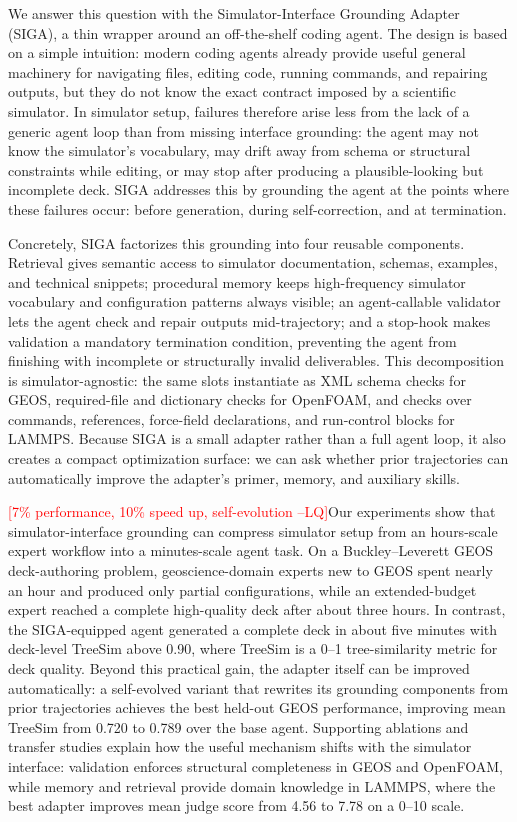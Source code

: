 \documentclass{article}
\newcommand{\lianhui}[1]{\textcolor{red}{[#1 --LQ]}}
\begin{document}
We answer this question with the Simulator-Interface Grounding Adapter (SIGA), a thin wrapper around an off-the-shelf coding agent. The design is based on a simple intuition: modern coding agents already provide useful general machinery for navigating files, editing code, running commands, and repairing outputs, but they do not know the exact contract imposed by a scientific simulator. In simulator setup, failures therefore arise less from the lack of a generic agent loop than from missing interface grounding: the agent may not know the simulator’s vocabulary, may drift away from schema or structural constraints while editing, or may stop after producing a plausible-looking but incomplete deck. SIGA addresses this by grounding the agent at the points where these failures occur: before generation, during self-correction, and at termination.

Concretely, SIGA factorizes this grounding into four reusable components. Retrieval gives semantic access to simulator documentation, schemas, examples, and technical snippets; procedural memory keeps high-frequency simulator vocabulary and configuration patterns always visible; an agent-callable validator lets the agent check and repair outputs mid-trajectory; and a stop-hook makes validation a mandatory termination condition, preventing the agent from finishing with incomplete or structurally invalid deliverables. This decomposition is simulator-agnostic: the same slots instantiate as XML schema checks for GEOS, required-file and dictionary checks for OpenFOAM, and checks over commands, references, force-field declarations, and run-control blocks for LAMMPS. Because SIGA is a small adapter rather than a full agent loop, it also creates a compact optimization surface: we can ask whether prior trajectories can automatically improve the adapter’s primer, memory, and auxiliary skills.

\lianhui{7\% performance, 10\% speed up, self-evolution }Our experiments show that simulator-interface grounding can compress simulator setup from an hours-scale expert workflow into a minutes-scale agent task. On a Buckley–Leverett GEOS deck-authoring problem, geoscience-domain experts new to GEOS spent nearly an hour and produced only partial configurations, while an extended-budget expert reached a complete high-quality deck after about three hours. In contrast, the SIGA-equipped agent generated a complete deck in about five minutes with deck-level TreeSim above 0.90, where TreeSim is a 0–1 tree-similarity metric for deck quality. Beyond this practical gain, the adapter itself can be improved automatically: a self-evolved variant that rewrites its grounding components from prior trajectories achieves the best held-out GEOS performance, improving mean TreeSim from 0.720 to 0.789 over the base agent. Supporting ablations and transfer studies explain how the useful mechanism shifts with the simulator interface: validation enforces structural completeness in GEOS and OpenFOAM, while memory and retrieval provide domain knowledge in LAMMPS, where the best adapter improves mean judge score from 4.56 to 7.78 on a 0–10 scale.
\end{document}
